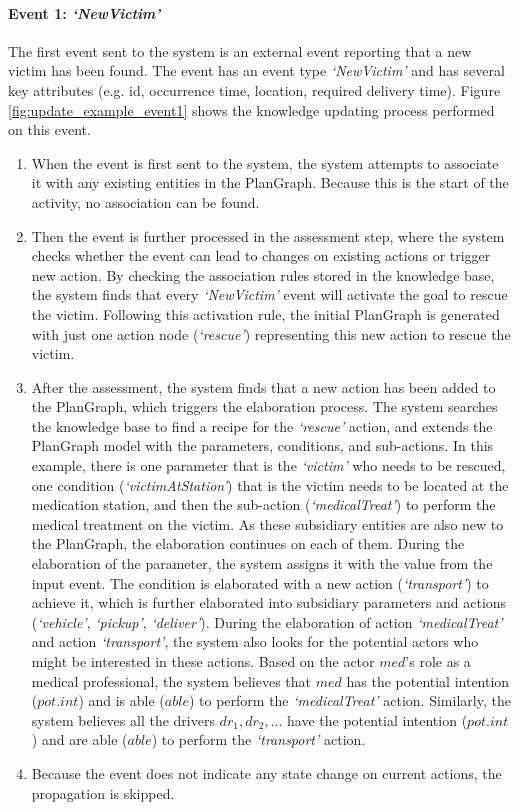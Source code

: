 \paragraph*{Event 1: \emph{`NewVictim'}} %
\label{par:event_1_emph_newvictim}
The first event sent to the system is an external event reporting that a new victim has been found. The event has an event type \emph{`NewVictim'} and has several key attributes (e.g. id, occurrence time, location, required delivery time). Figure \ref{fig:update_example_event1} shows the knowledge updating process performed on this event.

\begin{enumerate}
	\item When the event is first sent to the system, the system attempts to associate it with any existing entities in the PlanGraph. Because this is the start of the activity, no association can be found. 
	\item Then the event is further processed in the assessment step, where the system checks whether the event can lead to changes on existing actions or trigger new action. By checking the association rules stored in the knowledge base, the system finds that every \emph{`NewVictim'} event will activate the goal to rescue the victim. Following this activation rule, the initial PlanGraph is generated with just one action node (\emph{`rescue'}) representing this new action to rescue the victim.
	\item After the assessment, the system finds that a new action has been added to the PlanGraph, which triggers the elaboration process. The system searches the knowledge base to find a recipe for the \emph{`rescue'} action, and extends the PlanGraph model with the parameters, conditions, and sub-actions. In this example, there is one parameter that is the \emph{`victim'} who needs to be rescued, one condition (\emph{`victimAtStation'}) that is the victim needs to be located at the medication station, and then the sub-action (\emph{`medicalTreat'}) to perform the medical treatment on the victim. As these subsidiary entities are also new to the PlanGraph, the elaboration continues on each of them. During the elaboration of the parameter, the system assigns it with the value from the input event. The condition is elaborated with a new action (\emph{`transport'}) to achieve it, which is further elaborated into subsidiary parameters and actions (\emph{`vehicle'}, \emph{`pickup'}, \emph{`deliver'}). During the elaboration of action \emph{`medicalTreat'} and action \emph{`transport'}, the system also looks for the potential actors who might be interested in these actions. Based on the actor $med$'s role as a medical professional, the system believes that $med$ has the potential intention ($pot.int$) and is able ($able$) to perform the \emph{`medicalTreat'} action. Similarly, the system believes all the drivers $dr_1, dr_2, ...$ have the potential intention ($pot.int$) and are able ($able$) to perform the \emph{`transport'} action.
	\item Because the event does not indicate any state change on current actions, the propagation is skipped.
\end{enumerate}

